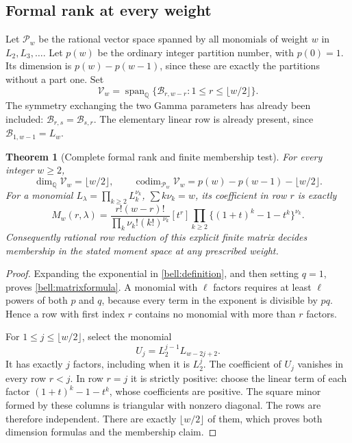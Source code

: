 \documentclass[11pt,a4paper]{article}
\numberwithin{equation}{section}
\newtheorem{theorem}{Theorem}[section]
\theoremstyle{definition}
\theoremstyle{remark}
\DeclareMathOperator{\Span}{span}
\newcommand{\Q}{\mathbb Q}
\begin{document}
\subsection{Formal rank at every weight}

Let $\mathcal P_w$ be the rational vector space spanned by all monomials
of weight $w$ in $L_2,L_3,\ldots$. Let $p(w)$ be the ordinary integer
partition number, with $p(0)=1$. Its dimension is
$p(w)-p(w-1)$, since these are exactly the partitions without a part one.
Set
\[
 \mathcal V_w=\Span_{\Q}\{\mathcal B_{r,w-r}:1\le r\le\lfloor w/2\rfloor\}.
\]
The symmetry exchanging the two Gamma parameters has already been
included: $\mathcal B_{r,s}=\mathcal B_{s,r}$. The elementary linear
row is already present, since $\mathcal B_{1,w-1}=L_w$.

\begin{theorem}[Complete formal rank and finite membership test]
\label{bell:rank}
For every integer $w\ge2$,
\begin{equation}
 \dim_{\Q}\mathcal V_w=\lfloor w/2\rfloor,\qquad
 \operatorname{codim}_{\mathcal P_w}\mathcal V_w
       =p(w)-p(w-1)-\lfloor w/2\rfloor.
 \label{bell:rankformula}
\end{equation}
For a monomial $L_\lambda=\prod_{k\ge2}L_k^{\nu_k}$,
$\sum k\nu_k=w$, its coefficient in row $r$ is exactly
\begin{equation}
 M_w(r,\lambda)
 =\frac{r!(w-r)!}{\prod_k\nu_k!(k!)^{\nu_k}}
 [t^r]\prod_{k\ge2}\{(1+t)^k-1-t^k\}^{\nu_k}.
 \label{bell:matrixformula}
\end{equation}
Consequently rational row reduction of this explicit finite matrix
decides membership in the stated moment space at any prescribed weight.
\end{theorem}

\begin{proof}
Expanding the exponential in \eqref{bell:definition}, and then setting
$q=1$, proves \eqref{bell:matrixformula}. A monomial with $\ell$ factors
requires at least $\ell$ powers of both $p$ and $q$, because every
term in the exponent is divisible by $pq$. Hence a row with first
index $r$ contains no monomial with more than $r$ factors.

For $1\le j\le\lfloor w/2\rfloor$, select the monomial
\[
 U_j=L_2^{j-1}L_{w-2j+2}.
\]
It has exactly $j$ factors, including when it is $L_2^j$. The
coefficient of $U_j$ vanishes in every row $r<j$. In row $r=j$ it is
strictly positive: choose the linear term of each factor
$(1+t)^k-1-t^k$, whose coefficients are positive. The square minor
formed by these columns is triangular with nonzero diagonal. The
rows are therefore independent. There are exactly $\lfloor w/2\rfloor$
of them, which proves both dimension formulas and the membership claim.
\end{proof}
\end{document}
